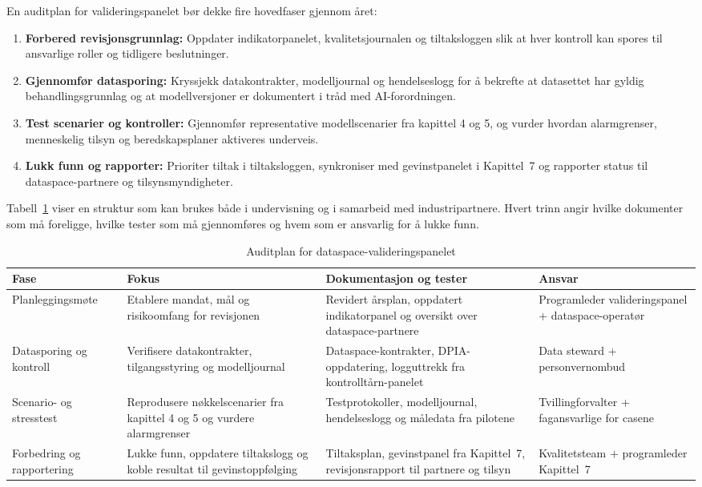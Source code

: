 En auditplan for valideringspanelet bør dekke fire hovedfaser gjennom året:
\begin{enumerate}
    \item \textbf{Forbered revisjonsgrunnlag:} Oppdater indikatorpanelet, kvalitetsjournalen og tiltaksloggen slik at hver kontroll kan spores til ansvarlige roller og tidligere beslutninger.
    \item \textbf{Gjennomfør datasporing:} Kryssjekk datakontrakter, modelljournal og hendelseslogg for å bekrefte at datasettet har gyldig behandlingsgrunnlag og at modellversjoner er dokumentert i tråd med AI-forordningen.
    \item \textbf{Test scenarier og kontroller:} Gjennomfør representative modellscenarier fra kapittel 4 og 5, og vurder hvordan alarmgrenser, menneskelig tilsyn og beredskapsplaner aktiveres underveis.
    \item \textbf{Lukk funn og rapporter:} Prioriter tiltak i tiltaksloggen, synkroniser med gevinstpanelet i Kapittel~7 og rapporter status til dataspace-partnere og tilsynsmyndigheter.
\end{enumerate}

Tabell~\ref{tab:dataspace-audit} viser en struktur som kan brukes både i undervisning og i samarbeid med industripartnere. Hvert trinn angir hvilke dokumenter som må foreligge, hvilke tester som må gjennomføres og hvem som er ansvarlig for å lukke funn.

\begin{table}[ht]
    \centering
    \caption{Auditplan for dataspace-valideringspanelet}
    \label{tab:dataspace-audit}
    \begin{tabular}{|p{3.2cm}|p{4.8cm}|p{4.6cm}|p{3.0cm}|}
        \hline
        \textbf{Fase} & \textbf{Fokus} & \textbf{Dokumentasjon og tester} & \textbf{Ansvar} \\
        \hline
        Planleggingsmøte & Etablere mandat, mål og risikoomfang for revisjonen & Revidert årsplan, oppdatert indikatorpanel og oversikt over dataspace-partnere \citep{digdir2024samstyring} & Programleder valideringspanel + dataspace-operatør \\
        \hline
        Datasporing og kontroll & Verifisere datakontrakter, tilgangsstyring og modelljournal & Dataspace-kontrakter, DPIA-oppdatering, logguttrekk fra kontrolltårn-panelet \citep{dfo2024internkontroll} & Data steward + personvernombud \\
        \hline
        Scenario- og stresstest & Reprodusere nøkkelscenarier fra kapittel 4 og 5 og vurdere alarmgrenser & Testprotokoller, modelljournal, hendelseslogg og måledata fra pilotene \citep{iso19011-2018} & Tvillingforvalter + fagansvarlige for casene \\
        \hline
        Forbedring og rapportering & Lukke funn, oppdatere tiltakslogg og koble resultat til gevinstoppfølging & Tiltaksplan, gevinstpanel fra Kapittel~7, revisjonsrapport til partnere og tilsyn & Kvalitetsteam + programleder Kapittel~7 \\
        \hline
    \end{tabular}
\end{table}


